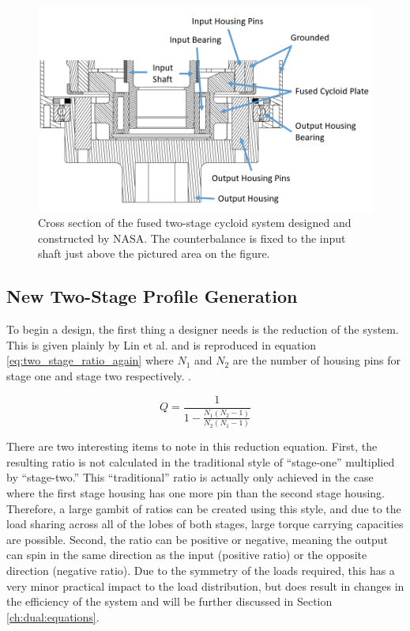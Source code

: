 \begin{figure}[!b]
	\centering
	\includegraphics[width=0.70\linewidth]{fig/two_stage_cross_section_labeled}
   \caption{Cross section of the fused two-stage cycloid system designed and constructed by NASA. The counterbalance is fixed to the input shaft just above the pictured area on the figure.}
   \label{fig:two_stage_design}
\end{figure}

\subsection{New Two-Stage Profile Generation} \label{ch:dual:initial_equation:profiles}

To begin a design, the first thing a designer needs is the reduction of the system. This is given plainly by Lin et al. and is reproduced in equation \ref{eq:two_stage_ratio_again} where $N_1$ and $N_2$ are the number of housing pins for stage one and stage two respectively. .

\begin{equation} \label{eq:two_stage_ratio_again}
Q = \frac{1}{1 - \frac{N_1 (N_2-1)}{N_2 (N_1-1)}}
\end{equation}

There are two interesting items to note in this reduction equation. First, the resulting ratio is not calculated in the traditional style of ``stage-one'' multiplied by ``stage-two.'' This ``traditional'' ratio is actually only achieved in the case where the first stage housing has one more pin than the second stage housing. Therefore, a large gambit of ratios can be created using this style, and due to the load sharing across all of the lobes of both stages, large torque carrying capacities are possible. Second, the ratio can be positive or negative, meaning the output can spin in the same direction as the input (positive ratio) or the opposite direction (negative ratio). Due to the symmetry of the loads required, this has a very minor practical impact to the load distribution, but does result in changes in the efficiency of the system and will be further discussed in Section \ref{ch:dual:equations}. 

